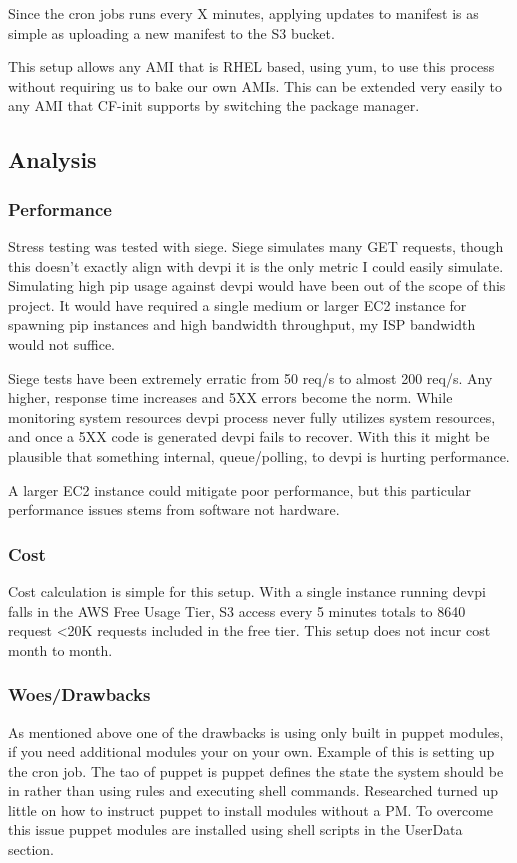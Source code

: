 \documentclass[12pt, letterpaper]{article}
\begin{document}
Since the cron jobs runs every X minutes, applying updates to manifest is as simple as uploading a new manifest to the S3 bucket.

This setup allows any AMI that is RHEL based, using yum, to use this process without requiring us to bake our own AMIs. This can
be extended very easily to any AMI that CF-init supports by switching the package manager.


\subsection{Analysis}
\subsubsection{Performance}
Stress testing was tested with siege. Siege simulates many GET requests, though this doesn't exactly align with devpi it is the only 
metric I could easily simulate. Simulating high pip usage against devpi would have been out of the scope of this project. It
would have required a single medium or larger EC2 instance for spawning pip instances and high bandwidth throughput, my ISP bandwidth
would not suffice.

Siege tests have been extremely erratic from 50 req/s to almost 200 req/s. Any higher, response time increases and 5XX errors become
the norm. While monitoring system resources devpi process never fully utilizes system resources, and once a 5XX code is generated 
devpi fails to recover. With this it might be plausible that something internal, queue/polling, to devpi is hurting performance.

A larger EC2 instance could mitigate poor performance, but this particular performance issues stems from software not hardware.

\subsubsection{Cost}
Cost calculation is simple for this setup. With a single instance running devpi falls in the AWS Free Usage Tier, S3 access every
5 minutes totals to 8640 request \textless 20K requests included in the free tier. This setup does not incur cost month to month.

\subsubsection{Woes/Drawbacks}
As mentioned above one of the drawbacks is using only built in puppet modules, if you need additional modules your on your own. 
Example of this is setting up the cron job. The tao of puppet is puppet defines the state the system should
be in rather than using rules and executing shell commands. Researched turned up little on how to instruct puppet to install modules
without a PM. To overcome this issue puppet modules are installed using shell scripts in the UserData section.
\end{document}
